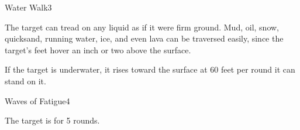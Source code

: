 \begin{spellsection}{Water Walk}{3}
    \begin{spellheader}
    \end{spellheader}
    \begin{spellcontent}
        \begin{spelltargetinginfo}
        \end{spelltargetinginfo}
        \begin{spelleffects}
            \spelleffect The target can tread on any liquid as if it were firm ground. Mud, oil, snow, quicksand, running water, ice, and even lava can be traversed easily, since the target's feet hover an inch or two above the surface.
            \par If the target is underwater, it rises toward the surface at 60 feet per round it can stand on it.
            \spelldur \durlong \dismissable
        \end{spelleffects}
    \end{spellcontent}
    \begin{spellfooter}
        \miscastexplode
    \end{spellfooter}
\end{spellsection}

\begin{spellsection}{Waves of Fatigue}{4}
    \begin{spellheader}
    \end{spellheader}
    \begin{spellcontent}
        \begin{spelltargetinginfo}
        \end{spelltargetinginfo}
        \begin{spelleffects}
            \spelleffect The target is \fatigued for 5 rounds.
        \end{spelleffects}
    \end{spellcontent}
    \begin{spellfooter}
        \miscastexplode
    \end{spellfooter}
\end{spellsection}

